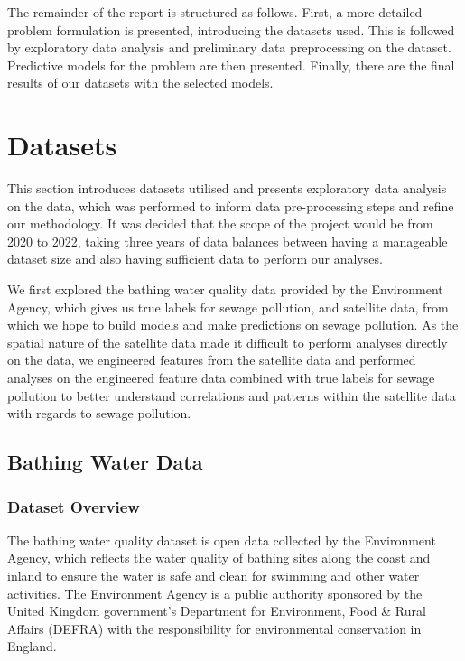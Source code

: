\documentclass[a4paper,11pt]{report}
\begin{document}
The remainder of the report is structured as follows. First, a more detailed problem formulation is presented, introducing the datasets used. This is followed by exploratory data analysis and preliminary data preprocessing on the dataset. Predictive models for the problem are then presented. Finally, there are the final results of our datasets with the selected models. 

\chapter{Datasets}
This section introduces datasets utilised and presents exploratory data analysis on the data, which was performed to inform data pre-processing steps and refine our methodology. It was decided that the scope of the project would be from 2020 to 2022, taking three years of data balances between having a manageable dataset size and also having sufficient data to perform our analyses. 

We first explored the bathing water quality data provided by the Environment Agency, which gives us true labels for sewage pollution, and satellite data, from which we hope to build models and make predictions on sewage pollution. As the spatial nature of the satellite data made it difficult to perform analyses directly on the data, we engineered features from the satellite data and performed analyses on the engineered feature data combined with true labels for sewage pollution to better understand correlations and patterns within the satellite data with regards to sewage pollution. 

\section{Bathing Water Data}

\subsection{Dataset Overview}

The bathing water quality dataset is open data collected by the Environment Agency, which reflects the water quality of bathing sites along the coast and inland to ensure the water is safe and clean for swimming and other water activities. The Environment Agency is a public authority sponsored by the United Kingdom government's Department for Environment, Food \& Rural Affairs (DEFRA) with the responsibility for environmental conservation in England.
\end{document}
